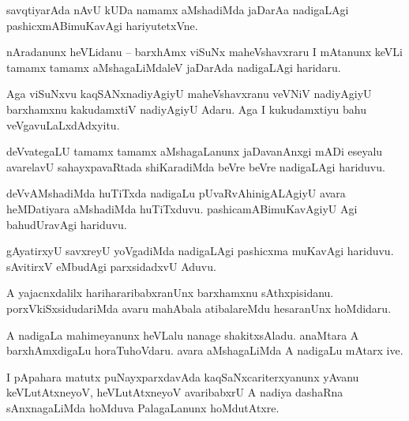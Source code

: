 \documentclass{article}
\begin{document}
\begin{mn}%
savqtiyarAda nAvU kUDa namamx aMshadiMda jaDarAa nadigaLAgi pashicxmABimuKavAgi hariyutetxVne.
\end{mn}

\begin{mn}%
nAradanunx heVLidanu -- barxhAmx viSuNx maheVshavxraru I mAtanunx keVLi tamamx tamamx 
aMshagaLiMdaleV jaDarAda nadigaLAgi haridaru.
\end{mn}

\begin{mn}%
Aga viSuNxvu kaqSANxnadiyAgiyU maheVshavxranu veVNiV nadiyAgiyU barxhamxnu kakudamxtiV nadiyAgiyU 
Adaru. Aga I kukudamxtiyu bahu veVgavuLaLxdAdxyitu.
\end{mn}

\begin{mn}%
deVvategaLU tamamx tamamx aMshagaLanunx jaDavanAnxgi mADi eseyalu avarelavU sahayxpavaRtada 
shiKaradiMda beVre beVre nadigaLAgi hariduvu.
\end{mn}

\begin{mn}%
deVvAMshadiMda huTiTxda nadigaLu pUvaRvAhinigALAgiyU avara heMDatiyara aMshadiMda huTiTxduvu. 
pashicamABimuKavAgiyU Agi bahudUravAgi hariduvu.
\end{mn}

\begin{mn}%
gAyatirxyU savxreyU yoVgadiMda nadigaLAgi pashicxma muKavAgi hariduvu. sAvitirxV eMbudAgi 
parxsidadxvU Aduvu.
\end{mn}

\begin{mn}%
A yajacnxdalilx harihararibabxranUnx barxhamxnu sAthxpisidanu. porxVkiSxsidudariMda avaru mahAbala 
atibalareMdu hesaranUnx hoMdidaru.
\end{mn}

\begin{mn}%
A nadigaLa mahimeyanunx heVLalu nanage shakitxsAladu. anaMtara A barxhAmxdigaLu horaTuhoVdaru. 
avara aMshagaLiMda A nadigaLu mAtarx ive.
\end{mn}

\begin{mn}%
I pApahara matutx puNayxparxdavAda kaqSaNxcariterxyanunx yAvanu keVLutAtxneyoV, heVLutAtxneyoV 
avaribabxrU A nadiya dashaRna sAnxnagaLiMda hoMduva PalagaLanunx hoMdutAtxre.
\end{mn}

\end{document}
